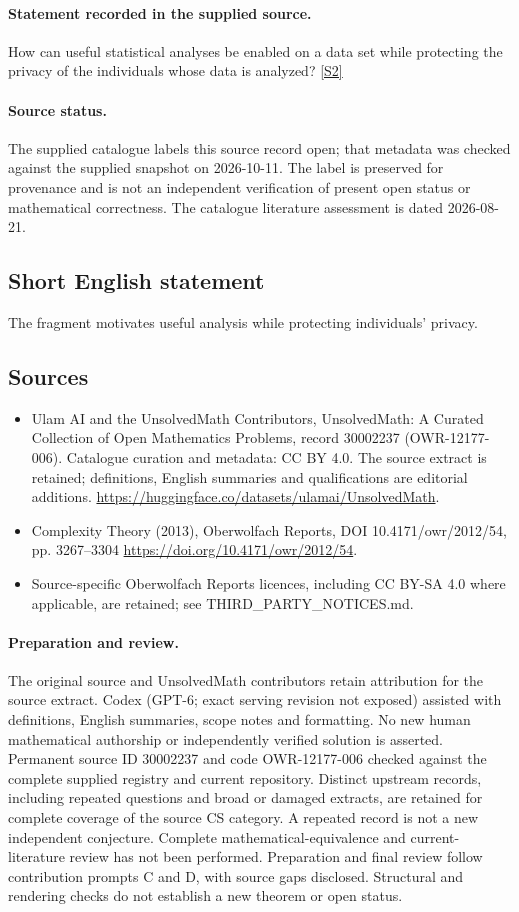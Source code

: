 \documentclass[11pt]{article}
\newcommand{\sref}[2]{\hyperlink{source:#1:#2}{[S#2]}}
\begin{document}
\paragraph{Statement recorded in the supplied source.}
How can useful statistical analyses be enabled on a data set while protecting the privacy of the individuals whose data is analyzed? \sref{30002237}{2}
\paragraph{Source status.}
The supplied catalogue labels this source record open; that metadata was checked against the supplied snapshot on 2026-10-11. The label is preserved for provenance and is not an independent verification of present open status or mathematical correctness. The catalogue literature assessment is dated 2026-08-21.
\subsection{Short English statement}
The fragment motivates useful analysis while protecting individuals' privacy.
\subsection{Sources}
\begin{itemize}
\item[\hypertarget{source:30002237:1}{S1}] Ulam AI and the UnsolvedMath Contributors, UnsolvedMath: A Curated Collection of Open Mathematics Problems, record 30002237 (OWR-12177-006). Catalogue curation and metadata: CC BY 4.0. The source extract is retained; definitions, English summaries and qualifications are editorial additions.
\url{https://huggingface.co/datasets/ulamai/UnsolvedMath}.
\item[\hypertarget{source:30002237:2}{S2}] Complexity Theory (2013), Oberwolfach Reports, DOI 10.4171/owr/2012/54, pp. 3267--3304
\url{https://doi.org/10.4171/owr/2012/54}.
\item Source-specific Oberwolfach Reports licences, including CC BY-SA 4.0 where applicable, are retained; see THIRD\_PARTY\_NOTICES.md.
\end{itemize}
\paragraph{Preparation and review.}
The original source and UnsolvedMath contributors retain attribution for the source extract. Codex (GPT-6; exact serving revision not exposed) assisted with definitions, English summaries, scope notes and formatting. No new human mathematical authorship or independently verified solution is asserted. Permanent source ID 30002237 and code OWR-12177-006 checked against the complete supplied registry and current repository. Distinct upstream records, including repeated questions and broad or damaged extracts, are retained for complete coverage of the source CS category. A repeated record is not a new independent conjecture. Complete mathematical-equivalence and current-literature review has not been performed. Preparation and final review follow contribution prompts C and D, with source gaps disclosed. Structural and rendering checks do not establish a new theorem or open status.
\label{end:30002237}
\end{document}
